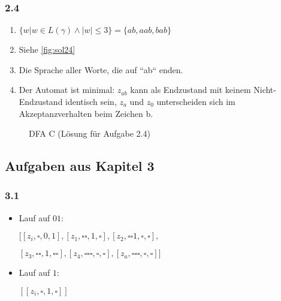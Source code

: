 \subsubsection*{2.4}

\begin{enumerate}[label=(\alph*)]
    \item $\{w|w \in L(\gamma) \wedge |w| \leq 3\} = \{ab, aab, bab\}$
    \item Siehe \autoref{fig:sol24}
    \item Die Sprache aller Worte, die auf ``ab`` enden.
    \item Der Automat ist minimal:
        $z_{ab}$ kann als Endzustand
        mit keinem Nicht-Endzustand identisch sein,
        $z_a$ und $z_0$ unterscheiden sich im Akzeptanzverhalten beim Zeichen b.
\end{enumerate}
\begin{figure}[ht] %
\centering %
    \caption{DFA C (Lösung für Aufgabe 2.4)}
\label{fig:sol24}
\end{figure}



\subsection*{Aufgaben aus Kapitel 3}

\subsubsection*{3.1}

\begin{itemize}
    \item Lauf auf $01$:

$[
    [z_i, \square, 0, 1],
    [z_1, \square\square, 1, \square],
    [z_2, \square\square 1, \square,\square],$

$
    [z_3, \square\square , 1,\square\square],
    [z_4, \square\square\square , \square,\square],
    [z_a, \square\square\square , \square,\square]
]$
    \item Lauf auf $1$:

$[
    [z_i, \square, 1, \square]
]$
\end{itemize}

